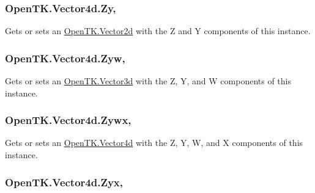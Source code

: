 \hypertarget{struct_open_t_k_1_1_vector4d_adc6bfcd46528871e76a47c83fc38b0fd}{
\subsubsection[{Zy}]{ Open\-T\-K.\-Vector4d.\-Zy\hspace{0.3cm}{\ttfamily [get]}, {\ttfamily [set]}}}\label{struct_open_t_k_1_1_vector4d_adc6bfcd46528871e76a47c83fc38b0fd}


Gets or sets an \hyperlink{struct_open_t_k_1_1_vector2d}{Open\-T\-K.\-Vector2d} with the Z and Y components of this instance. 

\hypertarget{struct_open_t_k_1_1_vector4d_a34fcf5a1437f2112426b3d5c5e2f55e8}{
\subsubsection[{Zyw}]{ Open\-T\-K.\-Vector4d.\-Zyw\hspace{0.3cm}{\ttfamily [get]}, {\ttfamily [set]}}}\label{struct_open_t_k_1_1_vector4d_a34fcf5a1437f2112426b3d5c5e2f55e8}


Gets or sets an \hyperlink{struct_open_t_k_1_1_vector3d}{Open\-T\-K.\-Vector3d} with the Z, Y, and W components of this instance. 

\hypertarget{struct_open_t_k_1_1_vector4d_a93e87ff99458410f8bd8e1953094f56b}{
\subsubsection[{Zywx}]{ Open\-T\-K.\-Vector4d.\-Zywx\hspace{0.3cm}{\ttfamily [get]}, {\ttfamily [set]}}}\label{struct_open_t_k_1_1_vector4d_a93e87ff99458410f8bd8e1953094f56b}


Gets or sets an \hyperlink{struct_open_t_k_1_1_vector4d}{Open\-T\-K.\-Vector4d} with the Z, Y, W, and X components of this instance. 

\hypertarget{struct_open_t_k_1_1_vector4d_af2ae726ea271da2fb92774de5514ef10}{
\subsubsection[{Zyx}]{ Open\-T\-K.\-Vector4d.\-Zyx\hspace{0.3cm}{\ttfamily [get]}, {\ttfamily [set]}}}\label{struct_open_t_k_1_1_vector4d_af2ae726ea271da2fb92774de5514ef10}


